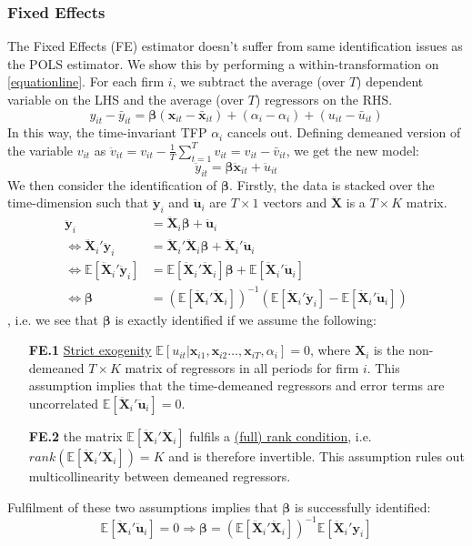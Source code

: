 \subsubsection*{Fixed Effects}
The Fixed Effects (FE) estimator doesn't suffer from same identification issues as the POLS estimator. We show this by performing a within-transformation on \eqref{equationline}. For each firm $i$, we subtract the average (over $T$) dependent variable  on the LHS and the average (over $T$) regressors on the RHS.
$$y_{it}-\bar{y}_{it} = \pmb{\beta}(\pmb{x}_{it}-\bar{\pmb{x}}_{it})+(\alpha_i-\alpha_i)+(u_{it} - \bar{u}_{it})$$
In this way, the time-invariant TFP $\alpha_i$ cancels out. Defining demeaned version of the variable $v_{it}$ as $\ddot{v}_{it}=v_{it}-\frac{1}{T}\sum_{t=1}^T {v_{it}}=v_{it}-\bar{v}_{it}$, we get the new model:
$$\ddot{y}_{it} = \pmb{\beta} \ddot{\pmb{x}}_{it}+\ddot{u}_{it}$$
We then consider the identification of $\pmb{\beta}$. Firstly, the data is stacked over the time-dimension such that $\ddot{\pmb{y}}_{i}$ and $\ddot{\pmb{u}}_{i}$ are $T \times 1$ vectors and $\pmb{\ddot{X}}$ is a $T\times K$ matrix.
\begin{align*}
    \ddot{\pmb{y}}_{i} &= \pmb{\ddot{X}}_{i} \pmb{\beta}  +\pmb{\ddot{u}}_{i} \\
    \Leftrightarrow \pmb{\ddot{X}}_{i}'\ddot{\pmb{y}}_{i}&=\pmb{\ddot{X}}_{i}'\pmb{\ddot{X}}_{i}\pmb{\beta} +\pmb{\ddot{X}}_{i}'\pmb{\ddot{u}}_{i} \\
    \Leftrightarrow \mathbb{E}[\pmb{\ddot{X}}_{i}'\pmb{\ddot{y}}_{i}] &=\mathbb{E}[\pmb{\ddot{X}}_{i}'\pmb{\ddot{X}}_{i}] \pmb{\beta}  + \mathbb{E}[\pmb{\ddot{X}}_{i}'\pmb{\ddot{u}}_{i}] \\ \Leftrightarrow  \pmb{\beta} &= (\mathbb{E}[\pmb{\ddot{X}}_{i}'\pmb{\ddot{X}}_{i}])^{-1} \left(  \mathbb{E}[\pmb{\ddot{X}}_{i}'\pmb{\ddot{y}}_{i}]-\mathbb{E}[\pmb{\ddot{X}}_{i}' \pmb{\ddot{u}}_{i}]\right)
\end{align*}
, i.e. we see that $\pmb{\beta}$ is exactly identified if we assume the following:
\begin{enumerate}
    \item[\textbf{FE.1}] \underline{Strict exogenity} $\mathbb{E}[u_{it}\vert \pmb{x}_{i1},\pmb{x}_{i2}\dots,\pmb{x}_{iT},\alpha_i]=0$, where $\pmb{X}_i$ is the non-demeaned $T \times K$ matrix of regressors in all periods for firm $i$.
    This assumption implies that the time-demeaned regressors and error terms are uncorrelated $\mathbb{E}[\pmb{\ddot{X}}_{i}' \pmb{\ddot{u}}_{i}]=0$.
    \item[\textbf{FE.2}] the matrix $\mathbb{E}[\pmb{\ddot{X}}_{i}'\pmb{\ddot{X}}_{i}]$ fulfils a \underline{ (full) rank condition}, i.e. $rank(\mathbb{E}[\pmb{\ddot{X}}_{i}'\pmb{\ddot{X}}_{i}])=K$ and is therefore invertible. This assumption rules out multicollinearity between demeaned regressors.
\end{enumerate}
Fulfilment of these two assumptions implies that $\pmb{\beta}$ is successfully identified:
$$\mathbb{E}[\pmb{\ddot{X}}_{i}' \pmb{\ddot{u}}_{i}]= 0\Rightarrow \pmb{\beta} = (\mathbb{E}[\pmb{\ddot{X}}_{i}'\pmb{\ddot{X}}_{i}])^{-1} \mathbb{E}[\pmb{\ddot{X}}_{i}'\pmb{y}_{i}]$$

